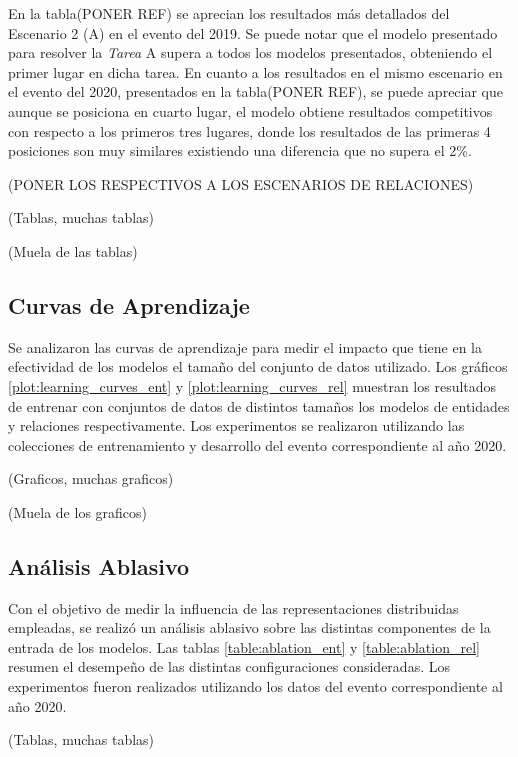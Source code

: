 En la tabla(PONER REF) se aprecian los resultados m\'as detallados del Escenario 2 (A) en el evento del 2019. Se puede notar que el modelo presentado para resolver la \emph{Tarea} A supera a todos los modelos presentados, obteniendo el primer lugar en dicha tarea. En cuanto a los resultados en el mismo escenario en el evento del 2020, presentados en la tabla(PONER REF), se puede apreciar que aunque se posiciona en cuarto lugar, el modelo obtiene resultados competitivos con respecto a los primeros tres lugares, donde los resultados de las primeras 4 posiciones son muy similares existiendo una diferencia que no supera el 2\%.

(PONER LOS RESPECTIVOS A LOS ESCENARIOS DE RELACIONES)



 

(Tablas, muchas tablas)

(Muela de las tablas)

\subsection{Curvas de Aprendizaje}

Se analizaron las curvas de aprendizaje para medir el impacto que tiene en la efectividad de los modelos el tamaño del conjunto de datos utilizado.
Los gráficos \ref{plot:learning_curves_ent} y \ref{plot:learning_curves_rel} muestran los resultados de entrenar con conjuntos de datos de distintos tamaños los modelos de entidades y relaciones respectivamente.
Los experimentos se realizaron utilizando las colecciones de entrenamiento y desarrollo del evento correspondiente al año 2020.

(Graficos, muchas graficos)

(Muela de los graficos)

\subsection{Análisis Ablasivo}

Con el objetivo de medir la influencia de las representaciones distribuidas empleadas, se realizó un análisis ablasivo sobre las distintas componentes de la entrada de los modelos.
Las tablas \ref{table:ablation_ent} y \ref{table:ablation_rel} resumen el desempeño de las distintas configuraciones consideradas.
Los experimentos fueron realizados utilizando los datos del evento correspondiente al año 2020.

(Tablas, muchas tablas)

